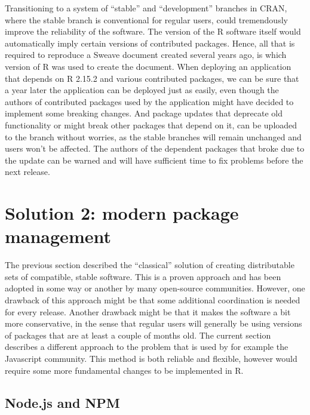 Transitioning to a system of ``stable'' and ``development'' branches in CRAN,
where the stable branch is conventional for regular users, could tremendously
improve the reliability of the software. The version of the R software itself
would automatically imply certain versions of contributed packages. Hence, all
that is required to reproduce a Sweave document created several years ago, is
which version of R was used to create the document. When deploying an
application that depends on R 2.15.2 and various contributed packages, we can
be sure that a year later the application can be deployed just as easily, even
though the authors of contributed packages used by the application might have
decided to implement some breaking changes.
And package updates that deprecate old functionality or might break other
packages that depend on it, can be uploaded to the  branch
without worries, as the stable branches will remain unchanged and users won't
be affected. The authors of the dependent packages that broke due to the update
can be warned and will have sufficient time to fix problems before the next
 release.

\section{Solution 2: modern package management}


The previous section described the ``classical'' solution of creating distributable
sets of compatible, stable software. This is a proven approach and has been
adopted in some way or another by many open-source communities. However, one
drawback of this approach might be that some additional coordination is needed
for every release. Another drawback might be that it makes the software a bit
more conservative, in the sense that regular users will generally be using
versions of packages that are at least a couple of months old. The current
section describes a different approach to the problem that is used by for
example the Javascript community. This method is both reliable and flexible,
however would require some more fundamental changes to be implemented in R.

\subsection{Node.js and NPM}

